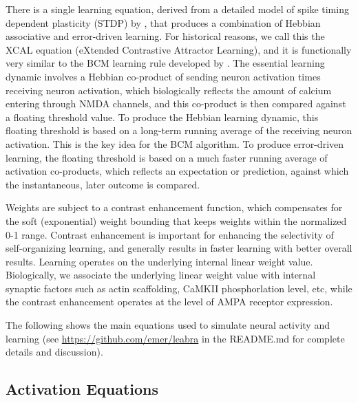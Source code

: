 \documentclass[10pt,letterpaper]{article}
\begin{document}
There is a single learning equation, derived from a detailed model of spike timing dependent plasticity (STDP) by \cite{UrakuboHondaFroemkeEtAl08}, that produces a combination of Hebbian associative and error-driven learning. For historical reasons, we call this the XCAL equation (eXtended Contrastive Attractor Learning), and it is functionally very similar to the BCM learning rule developed by \cite{BienenstockCooperMunro82}. The essential learning dynamic involves a Hebbian co-product of sending neuron activation times receiving neuron activation, which biologically reflects the amount of calcium entering through NMDA channels, and this co-product is then compared against a floating threshold value. To produce the Hebbian learning dynamic, this floating threshold is based on a long-term running average of the receiving neuron activation. This is the key idea for the BCM algorithm. To produce error-driven learning, the floating threshold is based on a much faster running average of activation co-products, which reflects an expectation or prediction, against which the instantaneous, later outcome is compared.

Weights are subject to a contrast enhancement function, which compensates for the soft (exponential) weight bounding that keeps weights within the normalized 0-1 range. Contrast enhancement is important for enhancing the selectivity of self-organizing learning, and generally results in faster learning with better overall results. Learning operates on the underlying internal linear weight value. Biologically, we associate the underlying linear weight value with internal synaptic factors such as actin scaffolding, CaMKII phosphorlation level, etc, while the contrast enhancement operates at the level of AMPA receptor expression. 

The following shows the main equations used to simulate neural activity and learning (see \url{https://github.com/emer/leabra} in the README.md for complete details and discussion).

\subsection{Activation Equations}
\end{document}
